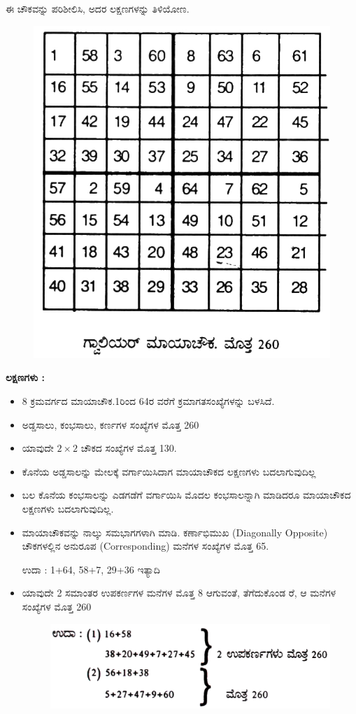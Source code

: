 ಈ ಚೌಕವನ್ನು ಪರಿಶೀಲಿಸಿ, ಅದರ ಲಕ್ಷಣಗಳನ್ನು ತಿಳಿಯೋಣ.
\begin{figure}[H]
\includegraphics{src/figures/chap4/fig4-21.jpg}
\end{figure}

\textbf{ಲಕ್ಷಣಗಳು :}

\begin{itemize}
	\item 8 ಕ್ರಮವರ್ಗದ ಮಾಯಾಚೌಕ.1ರಿಂದ 64ರ ವರೆಗೆ ಕ್ರಮಾಗತಸಂಖ್ಯೆಗಳನ್ನು ಬಳಸಿದೆ.
	\item ಅಡ್ಡಸಾಲು, ಕಂಭಸಾಲು, ಕರ್ಣಗಳ ಸಂಖ್ಯೆಗಳ ಮೊತ್ತ 260
	\item ಯಾವುದೇ $2 \times 2$ ಚೌಕದ ಸಂಖ್ಯೆಗಳ ಮೊತ್ತ 130.
	\item ಕೊನೆಯ ಅಡ್ಡಸಾಲನ್ನು ಮೇಲಕ್ಕೆ ವರ್ಗಾಯಿಸಿದಾಗ ಮಾಯಾಚೌಕದ ಲಕ್ಷಣಗಳು ಬದಲಾಗುವುದಿಲ್ಲ
	\item ಬಲ ಕೊನೆಯ ಕಂಭಸಾಲನ್ನು ಎಡಗಡೆಗೆ ವರ್ಗಾಯಿಸಿ ಮೊದಲ ಕಂಭಸಾಲನ್ನಾಗಿ ಮಾಡಿದರೂ ಮಾಯಾಚೌಕದ ಲಕ್ಷಣಗಳು ಬದಲಾಗುವುದಿಲ್ಲ.
	\item ಮಾಯಾಚೌಕವನ್ನು ನಾಲ್ಕು ಸಮಭಾಗಗಳಾಗಿ ಮಾಡಿ. ಕರ್ಣಾಭಿಮುಖ (Diagonally Opposite) ಚೌಕಗಳಲ್ಲಿನ ಅನುರೂಪ (Corresponding) ಮನೆಗಳ ಸಂಖ್ಯೆಗಳ ಮೊತ್ತ 65.

	ಉದಾ : 1+64, 58+7, 29+36 ಇತ್ಯಾದಿ
	\item ಯಾವುದೇ 2 ಸಮಾಂತರ ಉಪಕರ್ಣಗಳ ಮನೆಗಳ ಮೊತ್ತ 8 ಆಗುವಂತೆ, ತೆಗೆದುಕೊಂಡ ರೆ, ಆ ಮನೆಗಳ ಸಂಖ್ಯೆಗಳ ಮೊತ್ತ 260
	\begin{figure}[H]
	\includegraphics{src/figures/chap4/fig4-22.jpg}
	\end{figure}
\end{itemize}

